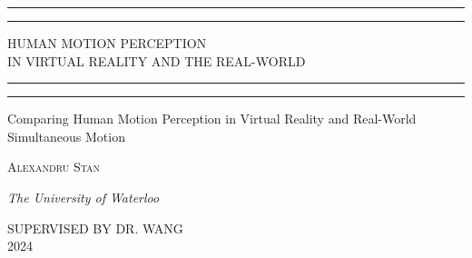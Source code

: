 \documentclass[a4paper, 12pt, oneside]{article}
\begin{document}
 

    \begin{titlepage} 

        \centering 
        
        \scshape 
        
        \vspace*{\baselineskip} 
        
        
        \rule{\textwidth}{1.6pt}\vspace*{-\baselineskip}\vspace*{2pt} %
        \rule{\textwidth}{0.4pt} %
        
        \vspace{0.75\baselineskip} 
        
        {\LARGE HUMAN MOTION PERCEPTION \\ IN VIRTUAL REALITY AND THE REAL-WORLD} 
        
        \vspace{0.75\baselineskip} 
        
        \rule{\textwidth}{0.4pt}\vspace*{-\baselineskip}\vspace{3.2pt} 
        \rule{\textwidth}{1.6pt} 
        
        \vspace{2\baselineskip}
        
        
        Comparing Human Motion Perception in Virtual Reality 
        and Real-World Simultaneous Motion
        
        \vspace*{3\baselineskip}
        
        \vspace{0.5\baselineskip} 
        
        {\scshape\Large Alexandru Stan } 
        
        \vspace{0.5\baselineskip} 
        
        \textit{The University of Waterloo} 
        
        \vfill 

        SUPERVISED BY DR. WANG\\
        2024 %

    \end{titlepage}
\end{document}

